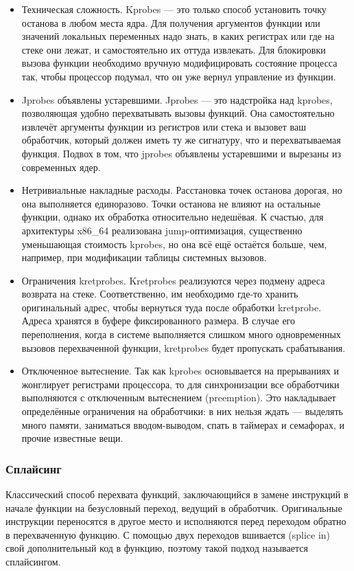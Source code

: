 \documentclass[a4paper,14pt]{extarticle}
\begin{document}
 	\begin{itemize}
 		\item Техническая сложность. Kprobes — это только способ установить точку останова в любом места ядра. Для получения аргументов функции или значений локальных переменных надо знать, в каких регистрах или где на стеке они лежат, и самостоятельно их оттуда извлекать. Для блокировки вызова функции необходимо вручную модифицировать состояние процесса так, чтобы процессор подумал, что он уже вернул управление из функции.
 		\item Jprobes объявлены устаревшими. Jprobes — это надстройка над kprobes, позволяющая удобно перехватывать вызовы функций. Она самостоятельно извлечёт аргументы функции из регистров или стека и вызовет ваш обработчик, который должен иметь ту же сигнатуру, что и перехватываемая функция. Подвох в том, что jprobes объявлены устаревшими и вырезаны из современных ядер.
 		\item Нетривиальные накладные расходы. Расстановка точек останова дорогая, но она выполняется единоразово. Точки останова не влияют на остальные функции, однако их обработка относительно недешёвая. К счастью, для архитектуры x86\_64 реализована jump-оптимизация, существенно уменьшающая стоимость kprobes, но она всё ещё остаётся больше, чем, например, при модификации таблицы системных вызовов.
 		\item Ограничения kretprobes. Kretprobes реализуются через подмену адреса возврата на стеке. Соответственно, им необходимо где-то хранить оригинальный адрес, чтобы вернуться туда после обработки kretprobe. Адреса хранятся в буфере фиксированного размера. В случае его переполнения, когда в системе выполняется слишком много одновременных вызовов перехваченной функции, kretprobes будет пропускать срабатывания.
 		\item Отключенное вытеснение. Так как kprobes основывается на прерываниях и жонглирует регистрами процессора, то для синхронизации все обработчики выполняются с отключенным вытеснением (preemption). Это накладывает определённые ограничения на обработчики: в них нельзя ждать — выделять много памяти, заниматься вводом-выводом, спать в таймерах и семафорах, и прочие известные вещи.
 	\end{itemize}
 
 	\subsubsection{Сплайсинг}
 	
 	Классический способ перехвата функций, заключающийся в замене инструкций в начале функции на безусловный переход, ведущий в обработчик. Оригинальные инструкции переносятся в другое место и исполняются перед переходом обратно в перехваченную функцию. С помощью двух переходов вшивается (splice in) свой дополнительный код в функцию, поэтому такой подход называется сплайсингом.
 	
\end{document}
